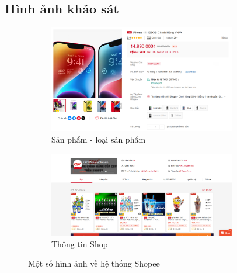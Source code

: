 \subsection{Hình ảnh khảo sát}
\begin{figure}[H]
    \centering
    \begin{subfigure}[b]{1\textwidth}
        \centering
        \includegraphics[width=0.9\textwidth]{Item-product_variant.png}
        \caption{Sản phẩm - loại sản phẩm}
    \end{subfigure}
    \hfill
    \begin{subfigure}[b]{1\textwidth}
        \centering
        \includegraphics[width=0.9\textwidth]{Shop.png}
        \caption{Thông tin Shop}
    \end{subfigure}
    \caption{Một số hình ảnh về hệ thống Shopee}
\end{figure}
